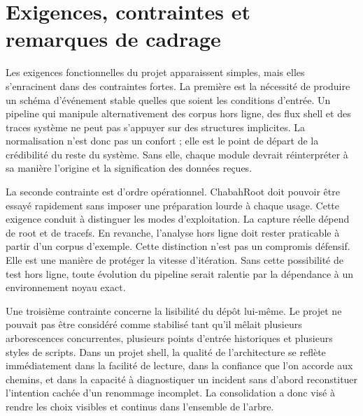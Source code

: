 \documentclass[12pt,a4paper]{report}
\begin{document}
\chapter{Exigences, contraintes et remarques de cadrage}
Les exigences fonctionnelles du projet apparaissent simples, mais elles s’enracinent dans des contraintes fortes. La première est la nécessité de produire un schéma d’événement stable quelles que soient les conditions d’entrée. Un pipeline qui manipule alternativement des corpus hors ligne, des flux shell et des traces système ne peut pas s’appuyer sur des structures implicites. La normalisation n’est donc pas un confort ; elle est le point de départ de la crédibilité du reste du système. Sans elle, chaque module devrait réinterpréter à sa manière l’origine et la signification des données reçues.

La seconde contrainte est d’ordre opérationnel. ChabahRoot doit pouvoir être essayé rapidement sans imposer une préparation lourde à chaque usage. Cette exigence conduit à distinguer les modes d’exploitation. La capture réelle dépend de root et de tracefs. En revanche, l’analyse hors ligne doit rester praticable à partir d’un corpus d’exemple. Cette distinction n’est pas un compromis défensif. Elle est une manière de protéger la vitesse d’itération. Sans cette possibilité de test hors ligne, toute évolution du pipeline serait ralentie par la dépendance à un environnement noyau exact.

Une troisième contrainte concerne la lisibilité du dépôt lui-même. Le projet ne pouvait pas être considéré comme stabilisé tant qu’il mêlait plusieurs arborescences concurrentes, plusieurs points d’entrée historiques et plusieurs styles de scripts. Dans un projet shell, la qualité de l’architecture se reflète immédiatement dans la facilité de lecture, dans la confiance que l’on accorde aux chemins, et dans la capacité à diagnostiquer un incident sans d’abord reconstituer l’intention cachée d’un renommage incomplet. La consolidation a donc visé à rendre les choix visibles et continus dans l’ensemble de l’arbre.
\end{document}
